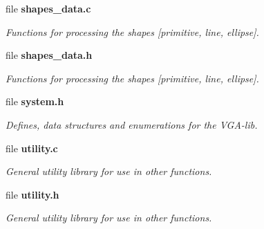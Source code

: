 \begin{DoxyCompactItemize}
file {\bf shapes\+\_\+data.\+c}
\begin{DoxyCompactList}\small\item\em Functions for processing the shapes [primitive, line, ellipse]. \end{DoxyCompactList}\item 
file {\bf shapes\+\_\+data.\+h}
\begin{DoxyCompactList}\small\item\em Functions for processing the shapes [primitive, line, ellipse]. \end{DoxyCompactList}\item 
file {\bf system.\+h}
\begin{DoxyCompactList}\small\item\em Defines, data structures and enumerations for the V\+G\+A-\/lib. \end{DoxyCompactList}\item 
file {\bf utility.\+c}
\begin{DoxyCompactList}\small\item\em General utility library for use in other functions. \end{DoxyCompactList}\item 
file {\bf utility.\+h}
\begin{DoxyCompactList}\small\item\em General utility library for use in other functions. \end{DoxyCompactList}\end{DoxyCompactItemize}
